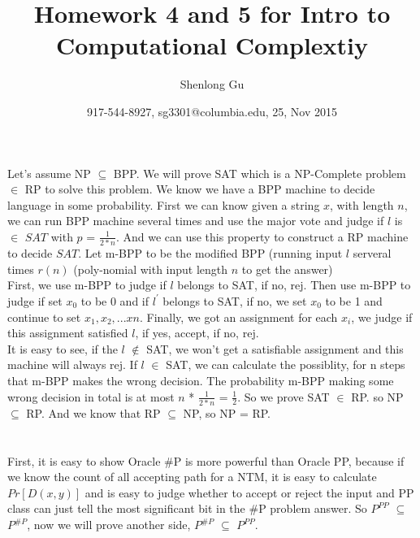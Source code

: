 \documentclass[11pt]{article}
\title{Homework 4 and 5 for Intro to Computational Complextiy}
\author{Shenlong Gu}
\date{917-544-8927, sg3301@columbia.edu, 25, Nov 2015}
\begin{document}
\maketitle
\part{}
Let's assume NP $\subseteq$ BPP. We will prove SAT which is a NP-Complete problem $\in$ RP to solve this problem. We know we have a BPP machine to decide language in some probability. First we can know given a string $x$, with length $n$, we can run BPP machine several times and use the major vote and judge if $l$ is $\in$ $SAT$ with $p$ = $\frac{1}{2 * n}$. And we can use this property to construct a RP machine to decide $SAT$. Let m-BPP to be the modified BPP (running input $l$ serveral times $r(n)$ (poly-nomial with input length $n$ to get the answer) \\
First, we use m-BPP to judge if $l$ belongs to SAT, if no, rej. Then use m-BPP to judge if set $x_{0}$ to be 0 and if $l^{'}$ belongs to SAT, if no, we set $x_{0}$ to be 1 and continue to set $x_{1}, x_{2}, ...x{n}$. Finally, we got an assignment for each $x_{i}$, we judge if this assignment satisfied $l$, if yes, accept, if no, rej. \\ 
It is easy to see, if the $l$ $\notin$ SAT, we won't get a satisfiable assignment and this machine will always rej. If $l$ $\in$ SAT, we can calculate the possiblity, for n steps that m-BPP makes the wrong decision. The probability m-BPP making some wrong decision in total is at most $n$ * $\frac{1}{2 * n}$ = $\frac{1}{2}$. So we prove SAT $\in$ RP. so NP $\subseteq$ RP. And we know that RP $\subseteq$ NP, so NP = RP.
\part{}
First, it is easy to show Oracle \#P is more powerful than Oracle PP, because if we know the count of all accepting path for a NTM, it is easy to calculate $Pr[D(x,y)]$ and is easy to judge whether to accept or reject the input and PP class can just tell the most significant bit in the \#P problem answer. So $P^{PP}$ $\subseteq$ $P^{\#P}$, now we will prove another side, $P^{\#P}$ $\subseteq$ $P^{PP}$. 
\end{document}
